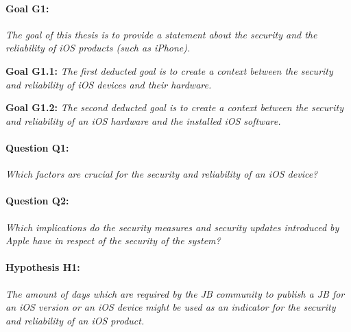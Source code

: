 \paragraph{Goal G1:} \textit{\glqq The goal of this thesis is to provide a statement about the security and the reliability of iOS products (such as iPhone).\grqq{}} \par
\textbf{Goal G1.1: }\textit{\glqq The first deducted goal is to create a context between the security and reliability of iOS devices and their hardware.\grqq{}} \par
\textbf{Goal G1.2:} \textit{\glqq The second deducted goal is to create a context between the security and reliability of an iOS hardware and the installed iOS software.\grqq{}}\par
\paragraph{Question Q1:} \textit{\glqq Which factors are crucial for the security and reliability of an iOS device?\grqq{}} \par
\paragraph{Question Q2:} \textit{\glqq Which implications do the security measures and security updates introduced by Apple have in respect of the security of the system?\grqq{}} \par

\paragraph{Hypothesis H1:} \textit{\glqq The amount of days which are required by the JB community to publish a JB for an iOS version or an iOS device might be used as an indicator for the security and reliability of an iOS product.\grqq{}} \par

